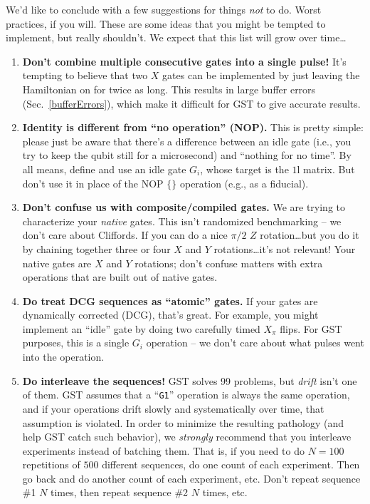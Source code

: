 \documentclass{article}[11pt]
\def\Id{1\!\mathrm{l}}
\begin{document}
We'd like to conclude with a few suggestions for things \emph{not} to do.  Worst practices, if you will.  These are some ideas that you might be tempted to implement, but really shouldn't.  We expect that this list will grow over time\ldots
\begin{enumerate}
\item \textbf{Don't combine multiple consecutive gates into a single pulse!}  It's tempting to believe that two $X$ gates can be implemented by just leaving the Hamiltonian on for twice as long. This results in large buffer errors (Sec.~\ref{bufferErrors}), which make it difficult for GST to give accurate results.
\item \textbf{Identity is different from ``no operation'' (NOP).}  This is pretty simple:  please just be aware that there's a difference between an idle gate (i.e., you try to keep the qubit still for a microsecond) and ``nothing for no time''.  By all means, define and use an idle gate $G_i$, whose target is the $\Id$ matrix.  But don't use it in place of the NOP $\{\}$ operation (e.g., as a fiducial).
\item \textbf{Don't confuse us with composite/compiled gates.}  We are trying to characterize your \emph{native} gates.  This isn't randomized benchmarking -- we don't care about Cliffords.  If you can do a nice $\pi/2$ $Z$ rotation\ldots but you do it by chaining together three or four $X$ and $Y$ rotations\ldots it's not relevant!  Your native gates are $X$ and $Y$ rotations; don't confuse matters with extra operations that are built out of native gates.
\item \textbf{Do treat DCG sequences as ``atomic'' gates.}  If your gates are dynamically corrected (DCG), that's great.  For example, you might implement an ``idle'' gate by doing two carefully timed $X_\pi$ flips.  For GST purposes, this is a single $G_i$ operation -- we don't care about what pulses went into the operation.
\item \textbf{Do interleave the sequences!}  GST solves 99 problems, but \emph{drift} isn't one of them.  GST assumes that a ``\texttt{G1}'' operation is always the same operation, and if your operations drift slowly and systematically over time, that assumption is violated.  In order to minimize the resulting pathology (and help GST catch such behavior), we \emph{strongly} recommend that you interleave experiments instead of batching them.  That is, if you need to do $N=100$ repetitions of $500$ different sequences, do one count of each experiment.  Then go back and do another count of each experiment, etc.  Don't repeat sequence \#1 $N$ times, then repeat sequence \#2 $N$ times, etc.
\end{enumerate}
\end{document}
